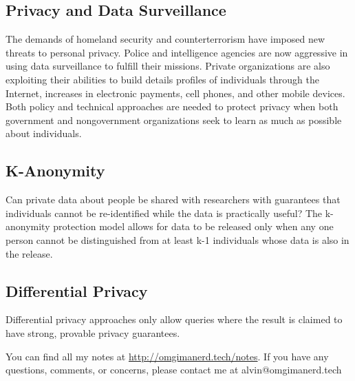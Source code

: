 \documentclass{math}
\begin{document}
\subsection*{Privacy and Data Surveillance}
The demands of homeland security and counterterrorism have imposed new threats
to personal privacy. Police and intelligence agencies are now aggressive in
using data surveillance to fulfill their missions. Private organizations are
also exploiting their abilities to build details profiles of individuals
through the Internet, increases in electronic payments, cell phones, and other
mobile devices. Both policy and technical approaches are needed to protect
privacy when both government and nongovernment organizations seek to learn as
much as possible about individuals.

\subsection*{K-Anonymity}
Can private data about people be shared with researchers with guarantees that
individuals cannot be re-identified while the data is practically useful? The
k-anonymity protection model allows for data to be released only when any
one person cannot be distinguished from at least k-1 individuals whose data is
also in the release.

\subsection*{Differential Privacy}
Differential privacy approaches only allow queries where the result is claimed
to have strong, provable privacy guarantees.

\begin{center}
  You can find all my notes at \url{http://omgimanerd.tech/notes}. If you have
  any questions, comments, or concerns, please contact me at
  alvin@omgimanerd.tech
\end{center}
\end{document}
